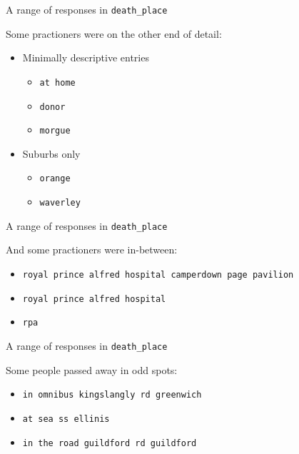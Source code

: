 \documentclass[]{beamer}
\begin{document}
\begin{frame}[fragile]{A range of responses in \texttt{death\_place}}

	Some practioners were on the other end of detail:
	\begin{itemize}
		\item \small Minimally descriptive entries 
		\begin{itemize}
			\item \texttt{at home}
			\item \texttt{donor}
			\item \texttt{morgue}
		\end{itemize}
		\item \small Suburbs only
		\begin{itemize}
			\item \texttt{orange}
			\item \texttt{waverley}
		\end{itemize}
	\end{itemize}

\end{frame}

\begin{frame}[fragile]{A range of responses in \texttt{death\_place}}

	And some practioners were in-between:
	\begin{itemize}
		\item \texttt{royal prince alfred hospital camperdown page pavilion}
		\item \texttt{royal prince alfred hospital}
		\item \texttt{rpa}
	\end{itemize}

\end{frame}

\begin{frame}[fragile]{A range of responses in \texttt{death\_place}}

	Some people passed away in odd spots:
	\begin{itemize}
		\item \texttt{in omnibus kingslangly rd greenwich}
		\item \texttt{at sea ss ellinis}
		\item \texttt{in the road guildford rd guildford}
	\end{itemize}

\end{frame}
\end{document}
